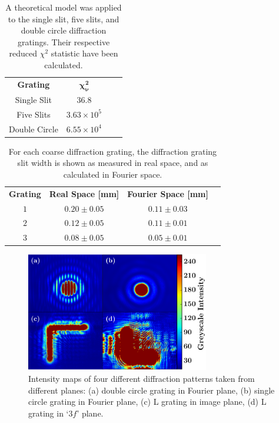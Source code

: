 \documentclass[twocolumn]{revtex4}
\begin{document}
\begin{table}[h!]
\centering
\begin{tabular}{c@{\hskip 20pt}c@{\hskip 20pt}c@{\hskip 20pt}c} 
 \hline
 \textbf{Grating} & $\boldsymbol{\chi_\nu^2}$ \\ [0.5ex] 
 Single Slit &$36.8$ \\ 
 Five Slits & $3.63\times10^{5}$ \\
 Double Circle & $6.55\times10^{4}$ \\
 \hline
\end{tabular}
\caption{A theoretical model was applied to the single slit, five slits, and double circle diffraction gratings. Their respective reduced $\chi^2$ statistic have been calculated. \\}
\label{theoretical_model_applying}
\end{table}
\begin{table}[h!]
\centering
\begin{tabular}{c@{\hskip 15pt}c@{\hskip 15pt}c@{\hskip 10pt}c} 
 \hline
 \textbf{Grating} & \textbf{Real Space [mm]} & \textbf{Fourier Space [mm]} \\ [0.5ex] 
 $1$ &$0.20\pm0.05$ & $0.11\pm0.03$ \\ 
 $2$ & $0.12\pm0.05$ & $0.11\pm0.01$ \\
 $3$ & $0.08\pm0.05$ & $0.05\pm0.01$ \\
 \hline
\end{tabular}
\caption{For each coarse diffraction grating, the diffraction grating slit width is shown as measured in real space, and as calculated in Fourier space. \\}
\label{realtofourier}
\end{table}
\begin{figure}[!h]
\begin{center}
\includegraphics[width=8cm]{results/collage3}
\caption[]{Intensity maps of four different diffraction patterns taken from different planes: (a) double circle grating in Fourier plane, (b) single circle grating in Fourier plane, (c) L grating in image plane, (d) L grating in `$3f$' plane.}
\label{collage}
\end{center}
\end{figure}
\end{document}
